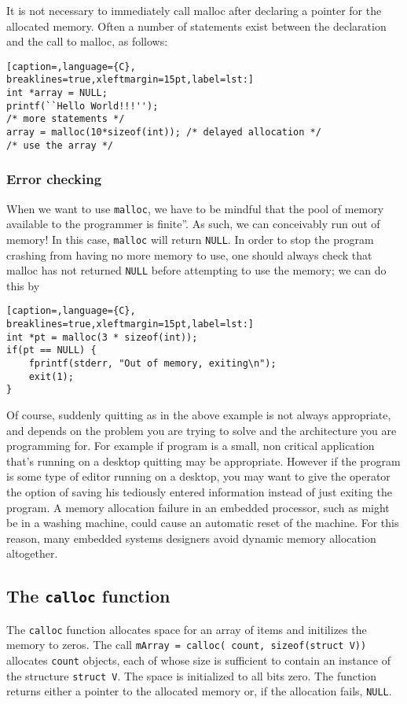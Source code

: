 It is not necessary to immediately call malloc after declaring a pointer for
the allocated memory.  Often a number of statements exist between the
declaration and the call to malloc, as follows:

\lstset{basicstyle=\scriptsize, numbers=left, captionpos=b, tabsize=4}
\begin{lstlisting}[caption=,language={C},
breaklines=true,xleftmargin=15pt,label=lst:]
int *array = NULL;
printf(``Hello World!!!'');
/* more statements */
array = malloc(10*sizeof(int)); /* delayed allocation */
/* use the array */
\end{lstlisting}

\subsubsection{Error checking}
When we want to use \texttt{malloc}, we have to be mindful that the pool of
memory available to the programmer is finite''. As such, we can conceivably run
out of memory! In this case, \texttt{malloc} will return \texttt{NULL}. In
order to stop the program crashing from having no more memory to use, one
should always check that malloc has not returned \texttt{NULL} before
attempting to use the memory; we can do this by 
\lstset{basicstyle=\scriptsize, numbers=left, captionpos=b, tabsize=4}
\begin{lstlisting}[caption=,language={C},
breaklines=true,xleftmargin=15pt,label=lst:]
int *pt = malloc(3 * sizeof(int));
if(pt == NULL) {
	fprintf(stderr, "Out of memory, exiting\n");
	exit(1);
}
\end{lstlisting}

Of course, suddenly quitting as in the above example is not always appropriate,
and depends on the problem you are trying to solve and the architecture you are
programming for. For example if program is a small, non critical application
that's running on a desktop quitting may be appropriate. However if the program
is some type of editor running on a desktop, you may want to give the operator
the option of saving his tediously entered information instead of just exiting
the program. A memory allocation failure in an embedded processor, such as
might be in a washing machine, could cause an automatic reset of the machine.
For this reason, many embedded systems designers avoid dynamic memory
allocation altogether.

\subsection{The \texttt{calloc} function}
The \texttt{calloc} function allocates space for an array of items and
initilizes the memory to zeros. The call \texttt{mArray = calloc( count,
sizeof(struct V))} allocates \texttt{count} objects, each of whose size is
sufficient to contain an instance of the structure \texttt{struct V}. The space
is initialized to all bits zero. The function returns either a pointer to the
allocated memory or, if the allocation fails, \texttt{NULL}.

